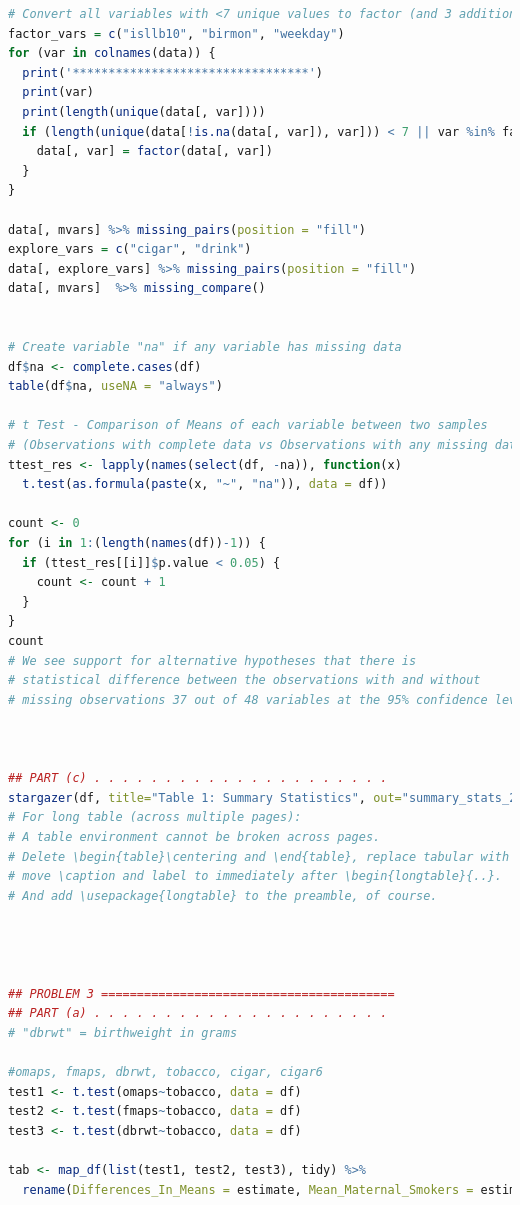 \documentclass[12pt]{article}
\begin{document}
\begin{lstlisting}[language=R]
# Convert all variables with <7 unique values to factor (and 3 additional variables)
factor_vars = c("isllb10", "birmon", "weekday")
for (var in colnames(data)) {
  print('*********************************')
  print(var)
  print(length(unique(data[, var])))
  if (length(unique(data[!is.na(data[, var]), var])) < 7 || var %in% factor_vars) {
    data[, var] = factor(data[, var])
  }
}

data[, mvars] %>% missing_pairs(position = "fill")
explore_vars = c("cigar", "drink")
data[, explore_vars] %>% missing_pairs(position = "fill")
data[, mvars]  %>% missing_compare()


# Create variable "na" if any variable has missing data
df$na <- complete.cases(df)
table(df$na, useNA = "always")

# t Test - Comparison of Means of each variable between two samples
# (Observations with complete data vs Observations with any missing data)
ttest_res <- lapply(names(select(df, -na)), function(x) 
  t.test(as.formula(paste(x, "~", "na")), data = df))

count <- 0
for (i in 1:(length(names(df))-1)) {
  if (ttest_res[[i]]$p.value < 0.05) {
    count <- count + 1
  }
}
count 
# We see support for alternative hypotheses that there is 
# statistical difference between the observations with and without 
# missing observations 37 out of 48 variables at the 95% confidence level.



## PART (c) . . . . . . . . . . . . . . . . . . . . . 
stargazer(df, title="Table 1: Summary Statistics", out="summary_stats_2c.tex")
# For long table (across multiple pages):
# A table environment cannot be broken across pages. 
# Delete \begin{table}\centering and \end{table}, replace tabular with longtable, 
# move \caption and label to immediately after \begin{longtable}{..}. 
# And add \usepackage{longtable} to the preamble, of course.




## PROBLEM 3 =========================================
## PART (a) . . . . . . . . . . . . . . . . . . . . . 
# "dbrwt" = birthweight in grams

#omaps, fmaps, dbrwt, tobacco, cigar, cigar6
test1 <- t.test(omaps~tobacco, data = df)
test2 <- t.test(fmaps~tobacco, data = df)
test3 <- t.test(dbrwt~tobacco, data = df)

tab <- map_df(list(test1, test2, test3), tidy) %>% 
  rename(Differences_In_Means = estimate, Mean_Maternal_Smokers = estimate1, Mean_Maternal_Non_Smokers = estimate2)


\end{lstlisting}
\end{document}
